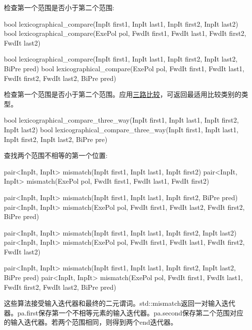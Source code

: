 检查第一个范围是否小于第二个范围:

\begin{cpp}
bool lexicographical_compare(InpIt first1, InpIt last1,
							 InpIt first2, InpIt last2)
bool lexicographical_compare(ExePol pol, FwdIt first1, FwdIt last1,
							 FwdIt first2, FwdIt last2)
							 
bool lexicographical_compare(InpIt first1, InpIt last1,
							 InpIt first2, InpIt last2, BiPre pred)
bool lexicographical_compare(ExePol pol, FwdIt first1, FwdIt last1,
							 FwdIt first2, FwdIt last2, BiPre pred)
\end{cpp}

检查第一个范围是否小于第二个范围。应用\href{https://en.cppreference.com/w/cpp/language/operator_comparison}{三路比较}，可返回最适用比较类别的类型。

\begin{cpp}
bool lexicographical_compare_three_way(InpIt first1, InpIt last1,
									   InpIt first2, InpIt last2)
bool lexicographical_compare_three_way(InpIt first1, InpIt last1,
									   InpIt first2, InpIt last2,
									   BiPre pre)
\end{cpp}

查找两个范围不相等的第一个位置:

\begin{cpp}
pair<InpIt, InpIt> mismatch(InpIt first1, InpIt last1,
							InpIt first2)
pair<InpIt, InpIt> mismatch(ExePol pol, FwdIt first1, FwdIt last1,
							FwdIt first2)
							
pair<InpIt, InpIt> mismatch(InpIt first1, InpIt last1,
							InpIt first2, BiPre pred)
pair<InpIt, InpIt> mismatch(ExePol pol, FwdIt first1, FwdIt last2,
							FwdIt first2, BiPre pred)
							
pair<InpIt, InpIt> mismatch(InpIt first1, InpIt last1,
							InpIt first2, InpIt last2)
pair<InpIt, InpIt> mismatch(ExePol pol, FwdIt first1, FwdIt last1,
							FwdIt first2, FwdIt last2)
							
pair<InpIt, InpIt> mismatch(InpIt first1, InpIt last1,
							InpIt first2, InpIt last2, BiPre pred)
pair<InpIt, InpIt> mismatch(ExePol pol, FwdIt first1, FwdIt last1,
							FwdIt first2, FwdIt last2, BiPre pred)
\end{cpp}

这些算法接受输入迭代器和最终的二元谓词。std::mismatch返回一对输入迭代器。pa.first保存第一个不相等元素的输入迭代器。pa.second保存第二个范围对应的输入迭代器。若两个范围相同，则得到两个end迭代器。



